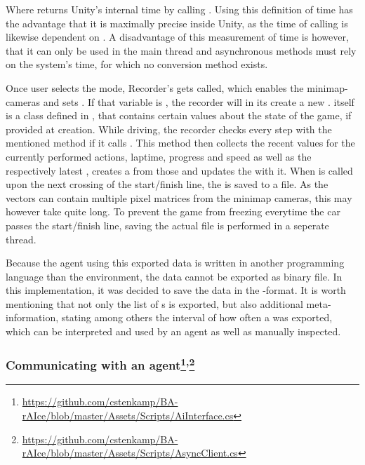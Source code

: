 Where  returns Unity's internal time by calling . Using this definition of time has the advantage that it is maximally precise inside Unity, as the time of calling  is likewise dependent on . A disadvantage of this measurement of time is however, that it can only be used in the main thread and asynchronous methods must rely on the system's time, for which no conversion method exists.

Once user selects the  mode, Recorder's  gets called, which enables the minimap-cameras and sets . If that variable is , the recorder will in its  create a new .  itself is a class defined in , that contains certain values about the state of the game, if provided at creation. While driving, the recorder checks every  step with the mentioned method if it calls . This method then collects the recent values for the currently performed actions, laptime, progress and speed as well as the respectively latest , creates a  from those and updates the  with it. When  is called upon the next crossing of the start/finish line, the  is saved to a file. As the vectors can contain multiple pixel matrices from the minimap cameras, this may however take quite long. To prevent the game from freezing everytime the car passes the start/finish line, saving the actual file is performed in a seperate thread.

Because the agent using this exported data is written in another programming language than the environment, the data cannot be exported as binary file. In this implementation, it was decided to save the data in the -format. It is worth mentioning that not only the list of s is exported, but also additional meta-information, stating among others the interval of how often a  was exported, which can be interpreted and used by an agent as well as manually inspected.

\subsubsection{Communicating with an agent\footnote{\url{https://github.com/cstenkamp/BA-rAIce/blob/master/Assets/Scripts/AiInterface.cs}}\textsuperscript{,}\footnote{\label{footnoteAiInt}\url{https://github.com/cstenkamp/BA-rAIce/blob/master/Assets/Scripts/AsyncClient.cs}}}

